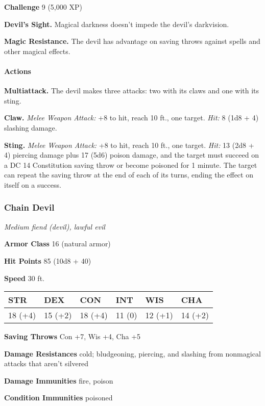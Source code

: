 \documentclass[
]{article}
\begin{document}
\textbf{Challenge} 9 (5,000 XP)

\textbf{Devil's Sight.} Magical darkness doesn't impede the devil's
darkvision.

\textbf{Magic Resistance.} The devil has advantage on saving throws
against spells and other magical effects.

\hypertarget{actions-11}{%
\paragraph{Actions}\label{actions-11}}

\textbf{Multiattack.} The devil makes three attacks: two with its claws
and one with its sting.

\textbf{Claw.} \emph{Melee Weapon Attack:} +8 to hit, reach 10 ft., one
target. \emph{Hit:} 8 (1d8 + 4) slashing damage.

\textbf{Sting.} \emph{Melee Weapon Attack:} +8 to hit, reach 10 ft., one
target. \emph{Hit:} 13 (2d8 + 4) piercing damage plus 17 (5d6) poison
damage, and the target must succeed on a DC 14 Constitution saving throw
or become poisoned for 1 minute. The target can repeat the saving throw
at the end of each of its turns, ending the effect on itself on a
success.

\hypertarget{chain-devil}{%
\subsubsection{Chain Devil}\label{chain-devil}}

\emph{Medium fiend (devil), lawful evil}

\textbf{Armor Class} 16 (natural armor)

\textbf{Hit Points} 85 (10d8 + 40)

\textbf{Speed} 30 ft.

\begin{longtable}[]{@{}llllll@{}}
\toprule
STR & DEX & CON & INT & WIS & CHA\tabularnewline
\midrule
\endhead
18 (+4) & 15 (+2) & 18 (+4) & 11 (0) & 12 (+1) & 14 (+2)\tabularnewline
\bottomrule
\end{longtable}

\textbf{Saving Throws} Con +7, Wis +4, Cha +5

\textbf{Damage Resistances} cold; bludgeoning, piercing, and slashing
from nonmagical attacks that aren't silvered

\textbf{Damage Immunities} fire, poison

\textbf{Condition Immunities} poisoned
\end{document}
